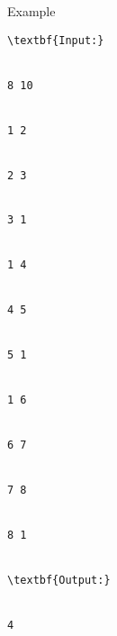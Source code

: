 Example
\begin{verbatim}
\textbf{Input:}


8 10


1 2


2 3


3 1


1 4


4 5


5 1


1 6


6 7


7 8


8 1


\textbf{Output:}


4


\end{verbatim}